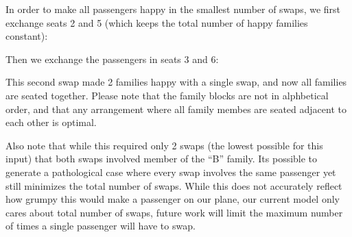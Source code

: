 In order to make all passengers happy in the smallest number of swaps, we first exchange seats 2 and 5 (which keeps the total number of happy families constant):

\begin{figure}[H]
\centering
{}
\end{figure}

Then we exchange the passengers in seats 3 and 6:

\begin{figure}[H]
\centering
{}
\end{figure}

This second swap made 2 families happy with a single swap, and now all families are seated together. Please note that the family blocks are not in alphbetical order, and that any arrangement where all family membes are seated adjacent to each other is optimal.  

Also note that while this required only 2 swaps (the lowest possible for this input) that both swaps involved member of the ``B'' family.  Its possible to generate a pathological case where every swap involves the same passenger yet still minimizes the total number of swaps.  While this does not accurately reflect how grumpy this would make a passenger on our plane, our current model only cares about total number of swaps, future work will limit the maximum number of times a single passenger will have to swap.


